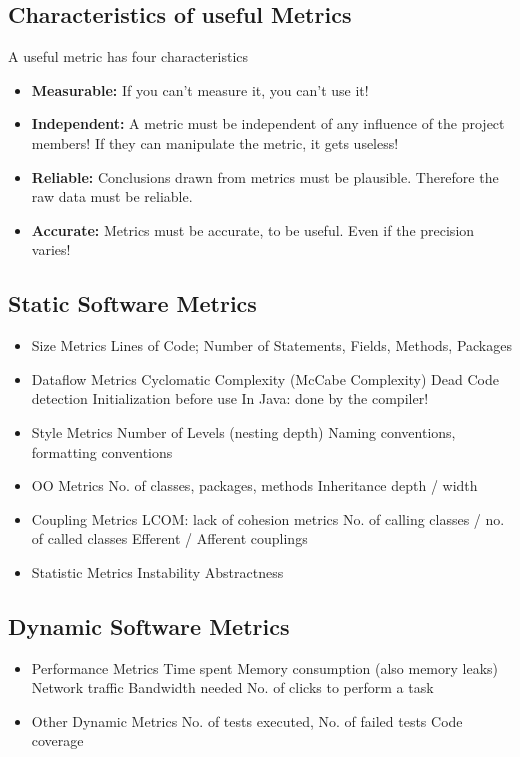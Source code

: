 \documentclass[10pt]{article}
\begin{document}
	\subsection{Characteristics of useful Metrics}
	A useful metric has four characteristics
	\begin{itemize}
		\item \textbf{Measurable:} If you can’t measure it, you can’t use it!
		\item \textbf{Independent:} A metric must be independent of any influence of the project members! If they can manipulate the metric, it gets useless!
		\item \textbf{Reliable:} Conclusions drawn from metrics must be plausible. Therefore the raw data must be reliable.
		\item \textbf{Accurate:} Metrics must be accurate, to be useful. Even if the precision varies!
	\end{itemize}
	\subsection{Static Software Metrics}
	\begin{itemize}
		\item  Size Metrics
			\subitem Lines of Code; Number of Statements, Fields, Methods, Packages
		\item Dataflow Metrics
			\subitem Cyclomatic Complexity (McCabe Complexity)
    		\subitem Dead Code detection Initialization before use
			\subitem In Java: done by the compiler!
  		\item Style Metrics
			\subitem Number of Levels (nesting depth)
			\subitem Naming conventions, formatting conventions
		\item OO Metrics
			\subitem No. of classes, packages, methods Inheritance depth / width
		\item Coupling Metrics
			\subitem LCOM: lack of cohesion metrics
			\subitem No. of calling classes / no. of called classes Efferent / Afferent couplings
		\item Statistic Metrics 
			\subitem Instability
			\subitem Abstractness
	\end{itemize}
	
	\subsection{Dynamic Software Metrics}
	\begin{itemize}
		\item Performance Metrics Time spent
			\subitem Memory consumption (also memory leaks) 
			\subitem Network traffic
			\subitem Bandwidth needed
			\subitem No. of clicks to perform a task
		\item Other Dynamic Metrics
			\subitem No. of tests executed, No. of failed tests 
			\subitem Code coverage
	\end{itemize}
	
\end{document}
